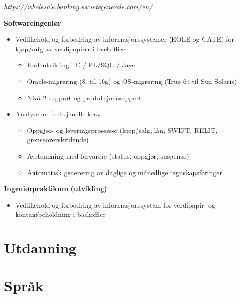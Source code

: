 \documentclass[11pt,a4paper]{moderncv}
\begin{document}
\newpage

{
	\textit{https://wholesale.banking.societegenerale.com/en/}

	\bigskip
	\textbf{Softwareingeniør}
\bigskip
\begin{itemize}
\item Vedlikehold og forbedring av informasjonssystemer (EOLE og GATE) for kjøp/salg av verdipapirer i backoffice
	\begin{itemize}
		\item Kodeutvikling i C / PL/SQL / Java
		\item Oracle-migrering (8i til 10g) og OS-migrering (True 64 til Sun Solaris)
		\item Nivå 2-support og produksjonssupport
\end{itemize}
\bigskip
\item Analyse av funksjonelle krav
	\begin{itemize}
		\item Oppgjør- og leveringsprosesser (kjøp/salg, lån, SWIFT, RELIT, grenseoverskridende)
		\item Avstemming med forvarere (status, oppgjør, suspense)
		\item Automatisk generering av daglige og månedlige regnskapsføringer
	\end{itemize}
\end{itemize}
}
\bigskip
{}
{
\bigskip
\textbf{Ingeniørpraktikum (utvikling)}
\bigskip
\begin{itemize}
	\item Vedlikehold og forbedring av informasjonssystem for verdipapir- og kontantbeholdning i backoffice
\end{itemize}
}
\section{Utdanning}



\section{Språk}
\end{document}
